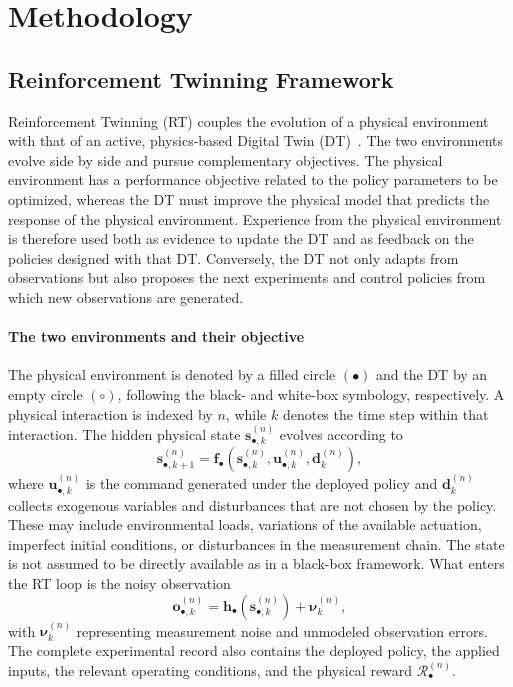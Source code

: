 \documentclass[journal]{IEEEtran}
\begin{document}
\section{Methodology}\label{sec:methodology}


\subsection{Reinforcement Twinning Framework}
\label{sec:rt-framework}

Reinforcement Twinning (RT) couples the evolution of a physical environment with that of an active, physics-based Digital Twin (DT)~\cite{SchenaRT2023,Mendez2026}. The two environments evolve side by side and pursue complementary objectives. The physical environment has a performance objective related to the policy parameters to be optimized, whereas the DT must improve the physical model that predicts the response of the physical environment. Experience from the physical environment is therefore used both as evidence to update the DT and as feedback on the policies designed with that DT. Conversely, the DT not only adapts from observations but also proposes the next experiments and control policies from which new observations are generated.

\paragraph*{The two environments and their objective}
The physical environment is denoted by a filled circle $(\bullet)$ and the DT by an empty circle $(\circ)$, following the black- and white-box symbology, respectively. A physical interaction is indexed by $n$, while $k$ denotes the time step within that interaction. The hidden physical state $\mathbf s_{\bullet,k}^{(n)}$ evolves according to
\begin{equation}
\mathbf s_{\bullet,k+1}^{(n)}=
\mathbf f_{\bullet}\!\left(
\mathbf s_{\bullet,k}^{(n)},
\mathbf u_{\bullet,k}^{(n)},
\mathbf d_k^{(n)}
\right),
\label{eq:rt-physical-state}
\end{equation}
where $\mathbf u_{\bullet,k}^{(n)}$ is the command generated under the deployed policy and $\mathbf d_k^{(n)}$ collects exogenous variables and disturbances that are not chosen by the policy. These may include environmental loads, variations of the available actuation, imperfect initial conditions, or disturbances in the measurement chain. The state is not assumed to be directly available as in a black-box framework. What enters the RT loop is the noisy observation
\begin{equation}
\mathbf o_{\bullet,k}^{(n)}=
\mathbf h_{\bullet}\!\left(\mathbf s_{\bullet,k}^{(n)}\right)
+\boldsymbol{\nu}_{k}^{(n)},
\label{eq:rt-physical-observation}
\end{equation}
with $\boldsymbol{\nu}_{k}^{(n)}$ representing measurement noise and unmodeled observation errors. The complete experimental record also contains the deployed policy, the applied inputs, the relevant operating conditions, and the physical reward $\mathcal R_{\bullet}^{(n)}$.
\end{document}
